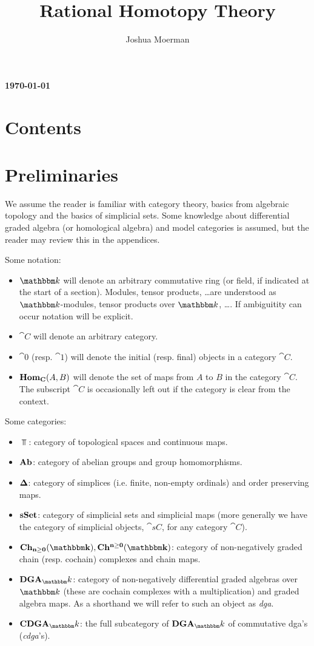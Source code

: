 \documentclass[a4paper, 12pt]{amsart}
\title{Rational Homotopy Theory}
\author{Joshua Moerman}
\begin{document}
\maketitle
{\bf \today}

\section*{Contents}
\tableofcontents

\section*{Preliminaries}
We assume the reader is familiar with category theory, basics from algebraic topology and the basics of simplicial sets. Some knowledge about differential graded algebra (or homological algebra) and model categories is assumed, but the reader may review this in the appendices.

Some notation:
\begin{itemize}
	\item $\k$ will denote an arbitrary commutative ring (or field, if indicated at the start of a section). Modules, tensor products, \dots are understood as $\k$-modules, tensor products over $\k$, \dots. If ambiguitity can occur notation will be explicit.
	\item $\cat{C}$ will denote an arbitrary category.
	\item $\cat{0}$ (resp. $\cat{1}$) will denote the initial (resp. final) objects in a category $\cat{C}$.
	\item $\mathbf{Hom}_{\mathbf{C}}(A, B)$ will denote the set of maps from $A$ to $B$ in the category $\cat{C}$. The subscript $\cat{C}$ is occasionally left out if the category is clear from the context.
\end{itemize}

Some categories:
\begin{itemize}
	\item $\Top$: category of topological spaces and continuous maps.
	\item $\mathbf{Ab}$: category of abelian groups and group homomorphisms.
	\item $\boldsymbol{\Delta}$: category of simplices (i.e. finite, non-empty ordinals) and order preserving maps.
	\item $\mathbf{s{\mathbf{Set}}}$: category of simplicial sets and simplicial maps (more generally we have the category of simplicial objects, $\cat{sC}$, for any category $\cat{C}$).
	\item $\Ch{\k}, \CoCh{\k}$: category of non-negatively graded chain (resp. cochain) complexes and chain maps.
	\item $\DGA_\k$: category of non-negatively differential graded algebras over $\k$ (these are cochain complexes with a multiplication) and graded algebra  maps. As a shorthand we will refer to such an object as \emph{dga}.
	\item $\CDGA_\k$: the full subcategory of $\DGA_\k$ of commutative dga's (\emph{cdga}'s).
\end{itemize}
\end{document}

